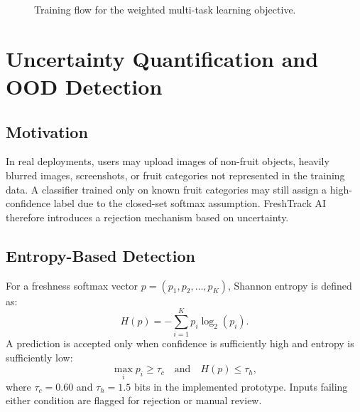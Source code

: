 \documentclass[conference]{IEEEtran}
\begin{document}
\begin{figure}[t]
\centering
{}
\caption{Training flow for the weighted multi-task learning objective.}
\label{fig:training_flow}
\end{figure}

\section{Uncertainty Quantification and OOD Detection}
\subsection{Motivation}
In real deployments, users may upload images of non-fruit objects, heavily blurred images, screenshots, or fruit categories not represented in the training data. A classifier trained only on known fruit categories may still assign a high-confidence label due to the closed-set softmax assumption. FreshTrack AI therefore introduces a rejection mechanism based on uncertainty.

\subsection{Entropy-Based Detection}
For a freshness softmax vector $p=(p_1,p_2,\ldots,p_K)$, Shannon entropy is defined as:
\begin{equation}
H(p)=-\sum_{i=1}^{K}p_i\log_2(p_i).
\end{equation}
A prediction is accepted only when confidence is sufficiently high and entropy is sufficiently low:
\begin{equation}
\max_i p_i \geq \tau_c \quad \text{and} \quad H(p) \leq \tau_h,
\end{equation}
where $\tau_c=0.60$ and $\tau_h=1.5$ bits in the implemented prototype. Inputs failing either condition are flagged for rejection or manual review.
\end{document}
